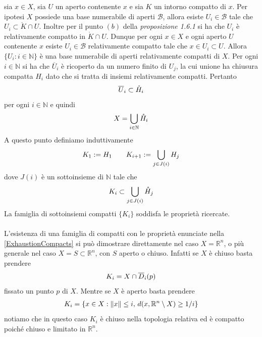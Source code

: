 \documentclass[oneside, 11pt]{amsbook}
\makeatletter
\newcommand{\0}{{(0)}}
\newcommand{\3}{{(3)}}
\theoremstyle{colonplain}
\theoremstyle{colondefinition}
\theoremstyle{colonremark}
\numberwithin{equation}{chapter}
\renewcommand{\proofname}{Dimostrazione}
\renewenvironment{proof}[1][\proofname]{\par
  \pushQED{\qed}%
  \normalfont \topsep6\p@\@plus6\p@\relax
  \trivlist
  \item[\hskip\labelsep\bfseries #1:]\ignorespaces
}{%
  \popQED\endtrivlist\@endpefalse
}
\makeatother
\begin{document}
\begin{proof}
sia $x \in X$, sia $U$ un aperto contenente $x$ e sia $K$ un intorno compatto di $x$. Per ipotesi $X$ possiede una base numerabile di aperti $\mathcal{B}$, allora esiste $U_i \in \mathcal{B}$ tale che $U_i \subset \mathring{K} \cap U$. Inoltre per il punto $(b)$ della \textit{proposizione 1.6.1} si ha che $U_i$ è relativamente compatto in $\mathring{K} \cap U$. Dunque per ogni $x \in X$ e ogni aperto $U$ contenente $x$ esiste $U_i \in \mathcal{B}$ relativamente compatto tale che $x \in U_i \subset U$. Allora $\{U_i : i \in \mathbb{N}\}$ è una base numerabile di aperti relativamente compatti di $X$. Per ogni $i \in \mathbb{N}$ si ha che $\overline{U}_i$ è ricoperto da un numero finito di $U_j$, la cui unione ha chiusura compatta $H_i$ dato che si tratta di insiemi relativamente compatti. Pertanto
\begin{align}
    \overline{U}_i \subset \mathring{H}_i \notag
\end{align}
per ogni $i \in \mathbb{N}$ e quindi
\begin{align}
    X = \bigcup_{i \in \mathbb{N}}\mathring{H}_i \notag
\end{align}
A questo punto definiamo induttivamente
\begin{align}
    K_1 := H_1 \qquad K_{i + 1} := \bigcup_{j \in J(i)}H_j \notag
\end{align}
dove $J(i)$ è un sottoinsieme di $\mathbb{N}$ tale che
\begin{align}
    K_i \subset \bigcup_{j \in J(i)}\mathring{H}_j \notag
\end{align}
La famiglia di sottoinsiemi compatti $\{K_i\}$ soddisfa le proprietà ricercate. \\ \\
L'esistenza di una famiglia di compatti con le proprietà enunciate nella \cref{ExhaustionCompacts} si può dimostrare direttamente nel caso $X = \mathbb{R}^n$, o più generale nel caso $X = S \subset \mathbb{R}^n$, con $S$ aperto o chiuso. Infatti se $X$ è chiuso basta prendere
\begin{align}
    K_i = X \cap \overline{D}_i(p) \notag
\end{align}
fissato un punto $p$ di $X$. Mentre se $X$ è aperto basta prendere
\begin{align}
    K_i = \{x \in X : \|x\| \leq i, \, d(x, \mathbb{R}^n \setminus X) \geq 1/i\} \notag
\end{align}
notiamo che in questo caso $K_i$ è chiuso nella topologia relativa ed è compatto poiché chiuso e limitato in $\mathbb{R}^n$.
\end{proof}
\end{document}
